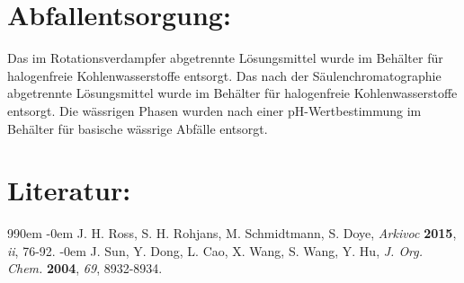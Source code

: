 \documentclass[12pt]{article}
\begin{document}
\begin{onehalfspace}
\section{Abfallentsorgung:}
Das im Rotationsverdampfer abgetrennte Lösungsmittel wurde im Behälter für halogenfreie Kohlenwasserstoffe entsorgt.
Das nach der Säulenchromatographie abgetrennte Lösungsmittel wurde im Behälter für halogenfreie Kohlenwasserstoffe entsorgt.
Die wässrigen Phasen wurden nach einer pH-Wertbestimmung im Behälter für basische wässrige Abfälle entsorgt.
\section{Literatur:}


\renewcommand{\section}[2]{}%
\def\bibindent{0em}
\begin{thebibliography}{99\kern\bibindent}
\makeatletter
\let\old@biblabel\@biblabel
\def\@biblabel#1{\old@biblabel{#1}\kern\bibindent}
\let\old@bibitem\bibitem
\def\bibitem#1{\old@bibitem{#1}\leavevmode\kern-\bibindent}
\makeatother
{}
J. H. Ross, S. H. Rohjans, M. Schmidtmann, S. Doye, \textit{Arkivoc} \textbf{2015}, \textit{ii}, 76-92.
J. Sun, Y. Dong, L. Cao, X. Wang, S. Wang, Y. Hu, \textit{J. Org. Chem.} \textbf{2004}, \textit{69}, 8932-8934.
\end{thebibliography}
\end{onehalfspace}
\end{document}
